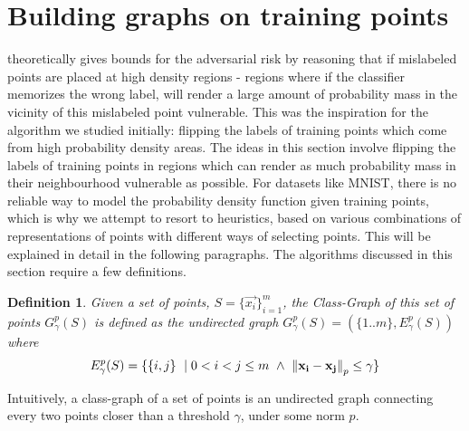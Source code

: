 \documentclass{ociamthesis}
\newtheorem{definition}{Definition}
\begin{document}

\section{Building graphs on training points}

\citet{sanyal2021how} theoretically gives bounds for the adversarial risk by
reasoning that if mislabeled points are placed at high density regions - regions
where if the classifier memorizes the wrong label, will render a large amount of
probability mass in the vicinity of this mislabeled point vulnerable. This was
the inspiration for the algorithm we studied initially: flipping the labels of
training points which come from high probability density areas. The ideas in
this section involve flipping the labels of training points in regions which can
render as much probability mass in their neighbourhood vulnerable as possible.
For datasets like MNIST, there is no reliable way to model the probability
density function given training points, which is why we attempt to resort to
heuristics, based on various combinations of representations of points with
different ways of selecting points. This will be explained in detail in the
following paragraphs. The algorithms discussed in this section require a few
definitions.

\begin{definition}
    Given a set of points, $S=\{\vec{x_i}\}_{i=1}^m$, the Class-Graph of this
    set of points $G_\gamma^{p}(S)$ is defined as the undirected graph
    $G_\gamma^{p}(S) = (\{1..m\}, E_\gamma^p(S))$ where
    \begin{equation*}
        E_\gamma^p(S) =
        \{\{i, j\}~\mid 0 < i < j \leq m~\wedge~
        \mathrm{\left\lVert{\mathbf{x_i}}-{\mathbf{x_j}}\right\rVert}_p \leq \gamma \}
    \end{equation*}
    \label{def:class-graph}
\end{definition}
Intuitively, a class-graph of a set of points is an undirected graph connecting
every two points closer than a threshold $\gamma$, under some norm $p$.
\end{document}
